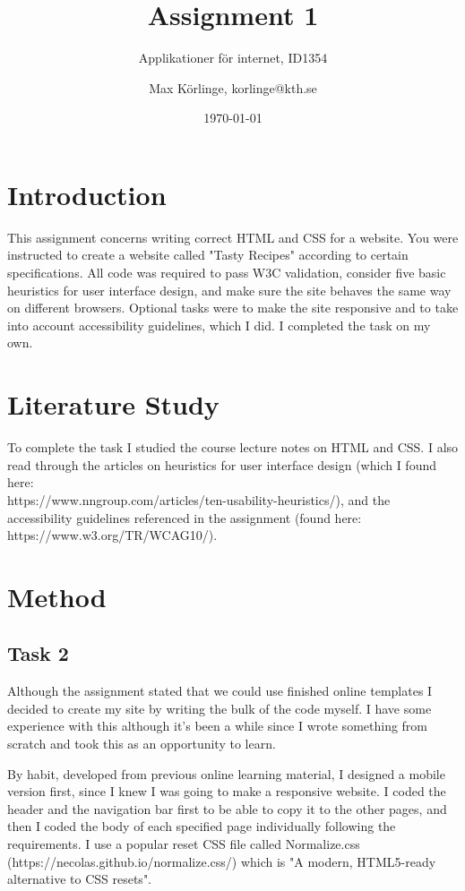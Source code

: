 \documentclass[a4paper]{scrreprt}
\title{Assignment 1}
\subtitle{Applikationer för internet, ID1354}
\author{Max Körlinge, korlinge@kth.se}
\date{\today}
\begin{document}
\maketitle

\tableofcontents %
\clearpage

\chapter{Introduction}

This assignment concerns writing correct HTML and CSS for a website. You were instructed to create a website called "Tasty Recipes" according to certain specifications. All code was required to pass W3C validation, consider five basic heuristics for user interface design, and make sure the site behaves the same way on different browsers. Optional tasks were to make the site responsive and to take into account accessibility guidelines, which I did. I completed the task on my own.

\chapter{Literature Study}

To complete the task I studied the course lecture notes on HTML and CSS. I also read through the articles on heuristics for user interface design (which I found here:\\ https://www.nngroup.com/articles/ten-usability-heuristics/), and the accessibility guidelines referenced in the assignment (found here: https://www.w3.org/TR/WCAG10/).

\chapter{Method}

\section{Task 2}

Although the assignment stated that we could use finished online templates I decided to create my site by writing the bulk of the code myself. I have some experience with this although it's been a while since I wrote something from scratch and took this as an opportunity to learn.

By habit, developed from previous online learning material, I designed a mobile version first, since I knew I was going to make a responsive website. I coded the header and the navigation bar first to be able to copy it to the other pages, and then I coded the body of each specified page individually following the requirements. I use a popular reset CSS file called Normalize.css (https://necolas.github.io/normalize.css/) which is "A modern, HTML5-ready alternative to CSS resets".
\end{document}
